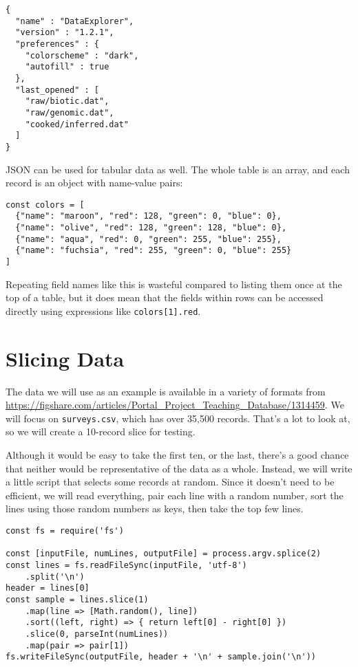 \begin{verbatim}
{
  "name" : "DataExplorer",
  "version" : "1.2.1",
  "preferences" : {
    "colorscheme" : "dark",
    "autofill" : true
  },
  "last_opened" : [
    "raw/biotic.dat",
    "raw/genomic.dat",
    "cooked/inferred.dat"
  ]
}
\end{verbatim}

JSON can be used for tabular data as well.
The whole table is an array,
and each record is an object with name-value pairs:

\begin{verbatim}
const colors = [
  {"name": "maroon", "red": 128, "green": 0, "blue": 0},
  {"name": "olive", "red": 128, "green": 128, "blue": 0},
  {"name": "aqua", "red": 0, "green": 255, "blue": 255},
  {"name": "fuchsia", "red": 255, "green": 0, "blue": 255}
]
\end{verbatim}

\noindent
Repeating field names like this is wasteful compared to listing them once at the top of a table,
but it does mean that the fields within rows can be accessed directly
using expressions like \texttt{colors[1].red}.

\section{Slicing Data}\label{s:dataman-slicing}

The data we will use as an example is available in a variety of formats
from \url{https://figshare.com/articles/Portal_Project_Teaching_Database/1314459}.
We will focus on \texttt{surveys.csv},
which has over 35,500 records.
That's a lot to look at,
so we will create a 10-record slice for testing.

Although it would be easy to take the first ten,
or the last,
there's a good chance that neither would be representative of the data as a whole.
Instead,
we will write a little script that selects some records at random.
Since it doesn't need to be efficient,
we will read everything,
pair each line with a random number,
sort the lines using those random numbers as keys,
then take the top few lines.

\begin{verbatim}
const fs = require('fs')

const [inputFile, numLines, outputFile] = process.argv.splice(2)
const lines = fs.readFileSync(inputFile, 'utf-8')
    .split('\n')
header = lines[0]
const sample = lines.slice(1)
    .map(line => [Math.random(), line])
    .sort((left, right) => { return left[0] - right[0] })
    .slice(0, parseInt(numLines))
    .map(pair => pair[1])
fs.writeFileSync(outputFile, header + '\n' + sample.join('\n'))
\end{verbatim}

